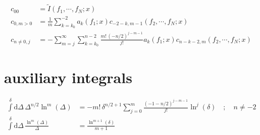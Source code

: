 \documentclass[a4paper,10pt,fleqn]{scrartcl}
\begin{document}
    \begin{align*}
        c_{00}
        &=
        {\tilde I}(f_1,\cdots,f_N;x)
        \\
        c_{0,m>0}
        &=
        \frac{1}{m}
        \sum\limits_{k=k_0}^{-2}
        a_k(f_1;x)
        c_{-2-k,m-1}(f_2,\cdots,f_N;x)
        \\
        c_{n\neq 0,j}
        &=
        -
        \sum_{m=j}^\infty
        \sum\limits_{k=k_0}^{n-2}
        \frac{m!\,(-n/2)^{j-m-1}}{j!}
        a_k(f_1;x)
        c_{n-k-2,m}(f_2,\cdots,f_N;x)
    \end{align*}

    \appendix
    \section{auxiliary integrals}
    \begin{align*}
        \int\limits^\delta \mathrm{d}\Delta\,
        \Delta^{n/2}
        \ln^m(\Delta)
        &=
        -m!\,
        \delta^{n/2+1}
        \sum\limits_{j=0}^m
        \frac{(-1-n/2)^{j-m-1}}{j!}
        \ln^j(\delta)
        \quad;\quad n\neq-2
        \\
        \int\limits^{\delta} \mathrm{d}\Delta\,
        \frac{\ln^m(\Delta)}{\Delta}
        &=
        \frac{\ln^{m+1}(\delta)}{m+1}
    \end{align*}
\end{document}
